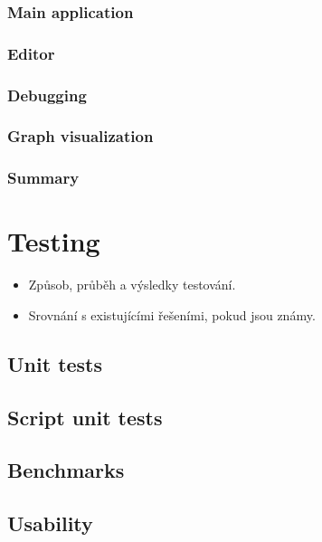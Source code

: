 \documentclass[11pt,twoside,a4paper]{book}
\begin{document}
\subsection{Main application}

\subsection{Editor}

\subsection{Debugging}

\subsection{Graph visualization}

\subsection{Summary}




\chapter{Testing}

\begin{itemize}
 \item Způsob, průběh a výsledky testování.
 \item Srovnání s existujícími řešeními, pokud jsou známy.
\end{itemize}

\section{Unit tests}

\section{Script unit tests}

\section{Benchmarks}

\section{Usability}
\end{document}
